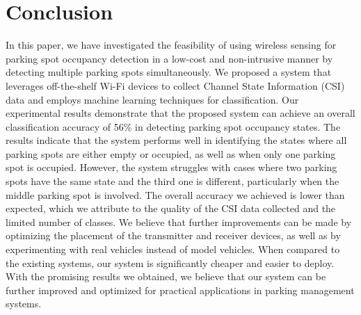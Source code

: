 
\section{Conclusion}
\label{sec:conclusion}

In this paper, we have investigated the feasibility of using wireless sensing for parking spot occupancy detection in a low-cost and non-intrusive manner by detecting multiple parking spots simultaneously. We proposed a system that leverages off-the-shelf Wi-Fi devices to collect Channel State Information (CSI) data and employs machine learning techniques for classification. Our experimental results demonstrate that the proposed system can achieve an overall classification accuracy of 56\% in detecting parking spot occupancy states. The results indicate that the system performs well in identifying the states where all parking spots are either empty or occupied, as well as when only one parking spot is occupied. However, the system struggles with cases where two parking spots have the same state and the third one is different, particularly when the middle parking spot is involved. The overall accuracy we achieved is lower than expected, which we attribute to the quality of the CSI data collected and the limited number of classes. We believe that further improvements can be made by optimizing the placement of the transmitter and receiver devices, as well as by experimenting with real vehicles instead of model vehicles. When compared to the existing systems, our system is significantly cheaper and easier to deploy. With the promising results we obtained, we believe that our system can be further improved and optimized for practical applications in parking management systems.